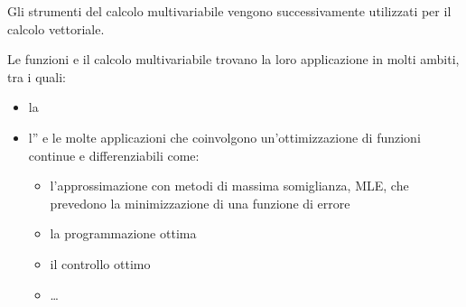 \documentclass[letterpaper,10pt,italian]{jupyterBook}
\begin{document}
\sphinxAtStartPar
Gli strumenti del calcolo multi\sphinxhyphen{}variabile vengono successivamente utilizzati per il calcolo vettoriale.

\sphinxAtStartPar
Le funzioni e il calcolo multi\sphinxhyphen{}variabile trovano la loro applicazione in molti ambiti, tra i quali:
\begin{itemize}
\item {} 
\sphinxAtStartPar
la   

\item {} 
\sphinxAtStartPar
l”   e le molte applicazioni che coinvolgono un’ottimizzazione di funzioni continue e differenziabili come:
\begin{itemize}
\item {} 
\sphinxAtStartPar
l’approssimazione con metodi di massima somiglianza, MLE, che prevedono la minimizzazione di una funzione di errore

\item {} 
\sphinxAtStartPar
la programmazione ottima

\item {} 
\sphinxAtStartPar
il controllo ottimo

\item {} 
\sphinxAtStartPar
…

\end{itemize}

\end{itemize}

\sphinxstepscope
\end{document}
